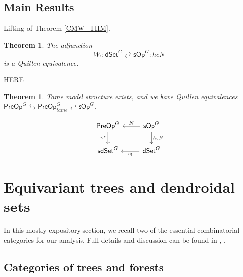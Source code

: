 \documentclass[a4paper,10pt
,draft
]{article}%
\numberwithin{equation}{section}
\numberwithin{figure}{section}
\newtheorem{theorem}[equation]{Theorem}%
\theoremstyle{definition} %
\newcommand{\sOp}{\ensuremath{\mathsf{sOp}}}%
\newcommand{\dSet}{\mathsf{dSet}}
\newcommand{\1}{\ensuremath{\mathbbm 1}}%
\begin{document}
\subsection{Main Results}


Lifting of Theorem \ref{CMW_THM}.

\begin{theorem}\label{QE THM}
The adjunction
\begin{equation}
      \label{QE_EQ}
      W_! \colon \dSet^G \rightleftarrows \sOp^G \colon hcN
\end{equation}
is a Quillen equivalence.
\end{theorem}


{\color{blue} HERE}



\begin{theorem}
	Tame model structure exists, and we have Quillen equivalences
	$\mathsf{PreOp}^G \leftrightarrows \mathsf{PreOp}^G_{tame} \rightleftarrows \sOp^G$.
\end{theorem}




\[
      \begin{tikzcd}
            \mathsf{PreOp}^G \ar{d}[swap]{\gamma^{\**}}&
            \mathsf{sOp}^G \ar{l}[swap]{N} \ar{d}{hcN}
            \\
            \mathsf{sdSet}^G &
            \mathsf{dSet}^G \ar{l}{c_{!}}
      \end{tikzcd}
\]





\newpage

\section{Equivariant trees and dendroidal sets}

In this mostly expository section, we recall two of the essential combinatorial categories for our analysis.
Full details and discussion can be found in \cite{Per18}, \cite{BP_edss}.


\subsection{Categories of trees and forests}
\label{FORESTS_SEC}
\end{document}
